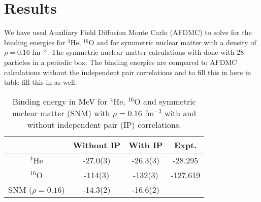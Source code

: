 \documentclass{article}
\newcommand{\red}[1]{{\color{red} #1}}
\begin{document}
\section{Results}
We have used Auxiliary Field Diffusion Monte Carlo (AFDMC) to solve for the binding energies for ${}^4$He, ${}^{16}$O and for symmetric nuclear matter with a density of $\rho=0.16$ fm$^{-3}$. The symmetric nuclear matter calculations with done with 28 particles in a periodic box. The binding energies are compared to AFDMC calculations without the independent pair correlations and to \red{fill this in here} in table \red{fill this in as well}.

\begin{table}[h!]
\centering
\caption{Binding energy in MeV for ${}^4$He, ${}^{16}$O and symmetric nuclear matter (SNM) with $\rho=0.16$ fm$^{-3}$ with and without independent pair (IP) correlations.}
\label{table:1}
\begin{tabular}{c c c c} 
 \hline\hline
  & Without IP & With IP & Expt. \\ %
 \hline
 ${}^4$He & -27.0(3) & -26.3(3) & -28.295 \\ 
 $^{16}$O & -114(3) & -132(3) & -127.619\\
 SNM ($\rho=0.16$) & -14.3(2) & -16.6(2) & \\ %
 \hline\hline
\end{tabular}
\end{table}



\end{document}
